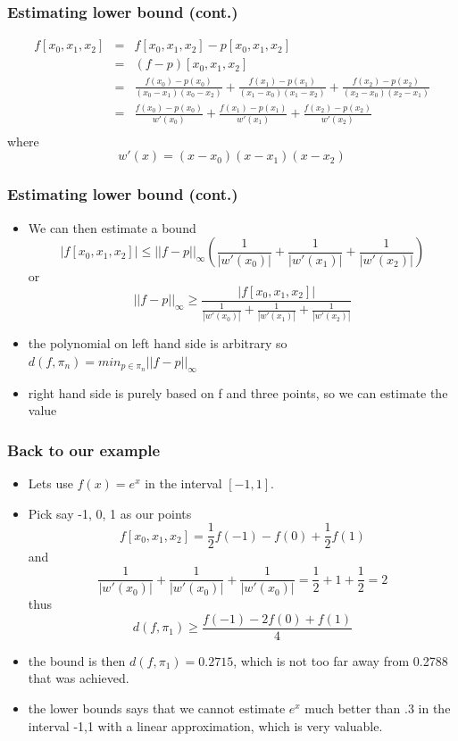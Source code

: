 \documentclass[10pt]{beamer}
\begin{document}
\begin{frame}
  \frametitle{Estimating lower bound (cont.)}
    \[
      \begin{array}{rcl}
        f[x_0, x_1, x_2] &=&  f[x_0, x_1, x_2] -  p[x_0, x_1, x_2]\\
                         &=&  (f-p)[x_0, x_1, x_2]\\
                         &=& \frac{f(x_0)-p(x_0)}{(x_0-x_1)(x_0-x_2)}+
                             \frac{f(x_1)-p(x_1)}{(x_1-x_0)(x_1-x_2)}+
                             \frac{f(x_2)-p(x_2)}{(x_2-x_0)(x_2-x_1)}\\
                         &=& \frac{f(x_0)-p(x_0)}{w'(x_0)}+
                             \frac{f(x_1)-p(x_1)}{w'(x_1)}+
                             \frac{f(x_2)-p(x_2)}{w'(x_2)}\\
      \end{array}
    \] where
    \[
      w'(x) = (x-x_0)(x-x_1)(x-x_2)
    \]
\end{frame}

\begin{frame}
  \frametitle{Estimating lower bound (cont.)}
  \begin{itemize}
  \item We can then estimate a bound
    \[
      | f[x_0,x_1,x_2] | \leq ||f-p||_{\infty}
      \left( \frac{1}{|w'(x_0)|} + \frac{1}{|w'(x_1)|} + \frac{1}{|w'(x_2)|} \right)
    \] or
    \[
      ||f-p||_{\infty} \geq \frac{| f[x_0,x_1,x_2] | }{\frac{1}{|w'(x_0)|} + \frac{1}{|w'(x_1)|} + \frac{1}{|w'(x_2)|}}
    \]
  \item the polynomial on left hand side is arbitrary so $d(f,\pi_n) = min_{p\in \pi_n}||f-p||_{\infty}$
  \item right hand side is purely based on f and three points, so we can estimate the value
  \end{itemize}
\end{frame}

\begin{frame}
  \frametitle{Back to our example}
  \begin{itemize}
  \item Lets use $f(x) = e^x$ in the interval $[-1,1]$.
  \item Pick say -1, 0, 1 as our points
    \[
      f[x_0,x_1,x_2] = \frac{1}{2} f(-1) - f(0) + \frac{1}{2} f(1)
    \] and
    \[
      \frac{1}{|w'(x_0)|} + \frac{1}{|w'(x_0)|} + \frac{1}{|w'(x_0)|} = \frac{1}{2} + 1 + \frac{1}{2} = 2
    \] thus
    \[
      d(f,\pi_1) \geq \frac{f(-1) - 2 f(0) + f(1)}{4}
    \]
  \item the bound is then $d(f,\pi_1) = 0.2715$, which is not too far away from 0.2788 that was achieved.
  \item the lower bounds says that we cannot estimate $e^x$ much
    better than .3 in the interval -1,1 with a linear approximation,
    which is very valuable.
  \end{itemize}
\end{frame}
\end{document}
